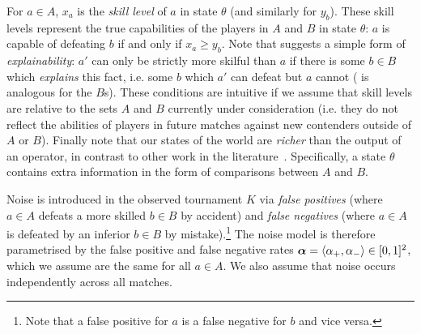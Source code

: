 For $a \in A$, $x_a$ is the \emph{skill level} of $a$ in state $\theta$ (and
similarly for $y_b$). These skill levels represent the true capabilities of the
players in $A$ and $B$ in state $\theta$: $a$ is capable of defeating $b$ if
and only if $x_a \ge y_b$.
%
Note that  suggests a simple form of
\emph{explainability}: $a'$ can only be strictly more skilful than $a$ if there
is some $b \in B$ which \emph{explains} this fact, i.e. some $b$ which $a'$ can
defeat but $a$ cannot ( is analogous for the
$B$s). These conditions are intuitive if we assume that skill levels are
relative to the sets $A$ and $B$ currently under consideration (i.e.
they do not reflect the abilities of players in future matches against new
contenders outside of $A$ or $B$). Finally note that our states of the world
are \emph{richer} than the output of an operator, in contrast to other work in
the literature~\cite{bradley_terry_52, gonzalez2014paired,
elkind2016rationalizations}. Specifically, a state $\theta$ contains extra
information in the form of comparisons between $A$ and $B$.

Noise is introduced in the observed tournament $K$ via \emph{false positives}
(where $a \in A$ defeats a more skilled $b \in B$ by accident) and \emph{false
negatives} (where $a \in A$ is defeated by an inferior $b \in B$ by
mistake).\footnote{Note that a false positive for $a$ is a false negative for
$b$ and vice versa.} The noise model is therefore parametrised by the false
positive and false negative rates $\bm{\alpha} = \langle{\alpha_+, \alpha_-}\rangle
\in [0,1]^2$, which we assume are the same for all $a \in A$.\footnotemark{} We
also assume that noise occurs independently across all matches.

\footnotetext{
    This is a strong assumption, and it may be more realistic to model the
    false positive/negative rates as a function of $x_a$. We leave this to
    future work.
}

